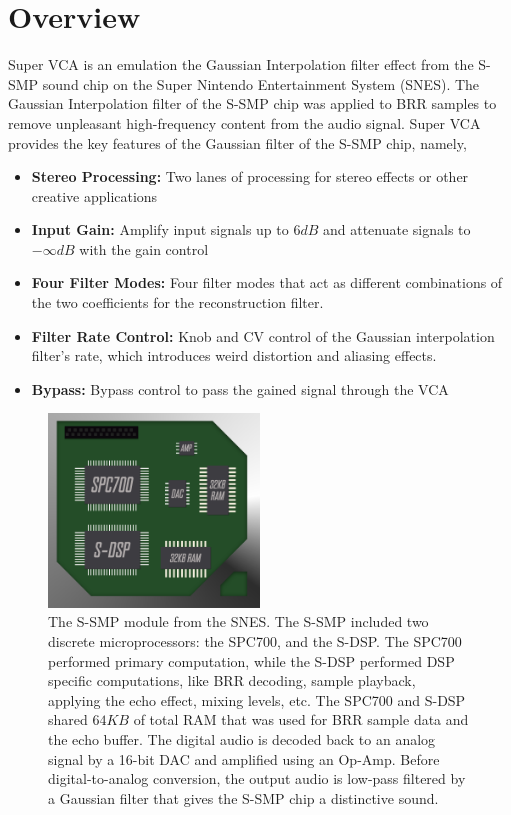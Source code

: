 \documentclass[12pt,letter]{article}
\begin{document}


\section{Overview}

Super VCA is an emulation the Gaussian Interpolation filter effect from the S-SMP sound chip on the Super Nintendo Entertainment System (SNES). The Gaussian Interpolation filter of the S-SMP chip was applied to BRR samples to remove unpleasant high-frequency content from the audio signal. Super VCA provides the key features of the Gaussian filter of the S-SMP chip,
namely,
\begin{itemize}
  \item \textbf{Stereo Processing:} Two lanes of processing for stereo effects or other creative applications
  \item \textbf{Input Gain:} Amplify input signals up to $6dB$ and attenuate signals to $-\infty dB$ with the gain control
  \item \textbf{Four Filter Modes:} Four filter modes that act as different combinations of the two coefficients for the reconstruction filter.
  \item \textbf{Filter Rate Control:} Knob and CV control of the Gaussian interpolation filter's rate, which introduces weird distortion and aliasing effects.
  \item \textbf{Bypass:} Bypass control to pass the gained signal through the VCA
\end{itemize}

\begin{figure}[!b]
\centering
\includegraphics[width=0.5\textwidth]{img/Chip}
\caption*{\small The S-SMP module from the SNES. The S-SMP included two discrete microprocessors: the SPC700, and the S-DSP. The SPC700 performed primary computation, while the S-DSP performed DSP specific computations, like BRR decoding, sample playback, applying the echo effect, mixing levels, etc. The SPC700 and S-DSP shared $64KB$ of total RAM that was used for BRR sample data and the echo buffer. The digital audio is decoded back to an analog signal by a 16-bit DAC and amplified using an Op-Amp. Before digital-to-analog conversion, the output audio is low-pass filtered by a Gaussian filter that gives the S-SMP chip a distinctive sound.}
\end{figure}
\end{document}
